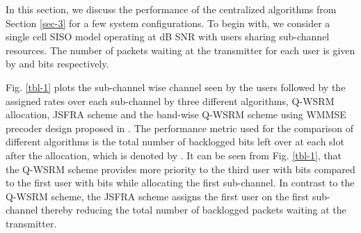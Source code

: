 
In this section, we discuss the performance of the centralized algorithms from Section \ref{sec-3} for a few system configurations. To begin with, we consider a single cell \ac{SISO} model operating at  dB \ac{SNR} with  users sharing  sub-channel resources. The number of packets waiting at the transmitter for each user is given by  and  bits respectively. 

Fig. \ref{tbl-1} plots the sub-channel wise channel seen by the users followed by the assigned rates over each sub-channel by three different algorithms, \ac{Q-WSRM} allocation, \ac{JSFRA} scheme and the band-wise \ac{Q-WSRM} scheme using \ac{WMMSE} precoder design proposed in \cite{wmmse_shi}. The performance metric used for the comparison of different algorithms is the total number of backlogged bits left over at each slot after the allocation, which is denoted by . It can be seen from Fig. \ref{tbl-1}, that the \ac{Q-WSRM} scheme provides more priority to the third user with  bits compared to the first user with  bits while allocating the first sub-channel. In contrast to the \ac{Q-WSRM} scheme, the \ac{JSFRA} scheme assigns the first user on the first sub-channel thereby reducing the total number of backlogged packets waiting at the transmitter.
